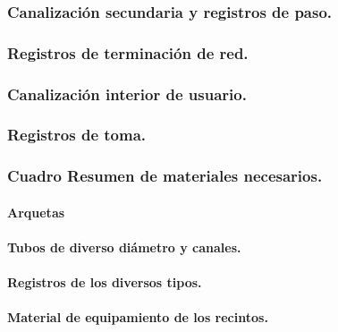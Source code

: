 \subsubsection{Canalización secundaria y registros de paso.}
\subsubsection{Registros de terminación de red.}
\subsubsection{Canalización interior de usuario.}
\subsubsection{Registros de toma.}
\subsubsection{Cuadro Resumen de materiales necesarios.}
\paragraph{Arquetas}
\paragraph{Tubos de diverso diámetro y canales.}
\paragraph{Registros de los diversos tipos.}
\paragraph{Material de equipamiento de los recintos.}